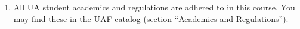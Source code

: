 \begin{enumerate}

\item All UA student academics and regulations are adhered to in this course. You may find these in the UAF catalog (section ``Academics and Regulations'').

\end{enumerate}

